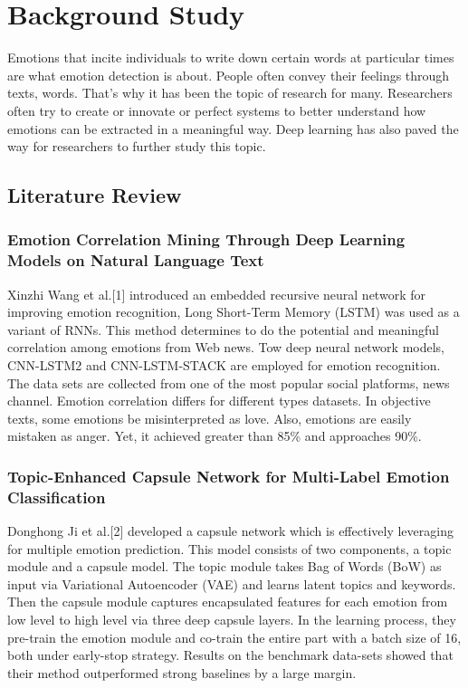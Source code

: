 \chapter{Background Study} \label{ch:literature_review}


Emotions that incite individuals to write down certain words at particular times are what emotion detection is about. People often convey their feelings through texts, words. That's why it has been the topic of research for many. Researchers often try to create or innovate or perfect systems to better understand how emotions can be extracted in a meaningful way. Deep learning has also paved the way for researchers to further study this topic.
\section{Literature Review}

\subsection{Emotion Correlation Mining Through Deep Learning Models on Natural Language Text}
Xinzhi Wang et al.[1] introduced an embedded recursive neural network for improving emotion recognition, Long Short-Term Memory (LSTM) was used as a variant of RNNs. This method determines to do the potential and meaningful correlation among emotions from Web news. Tow deep neural network models, CNN-LSTM2 and CNN-LSTM-STACK are employed for emotion recognition. The data sets are collected from one of the most popular social platforms, news channel. Emotion correlation differs for different types datasets. In objective texts, some emotions be misinterpreted as love. Also, emotions are easily mistaken as anger. Yet, it achieved greater than 85\% and approaches 90\%.


\subsection{Topic-Enhanced Capsule Network for Multi-Label Emotion Classification}
Donghong Ji et al.[2] developed a capsule network which is effectively leveraging for multiple emotion prediction. This model consists of two components, a topic module and a capsule model. The topic module takes Bag of Words (BoW) as input via Variational Autoencoder (VAE) and learns latent topics and keywords. Then the capsule module captures encapsulated features for each emotion from low level to high level via three deep capsule layers. In the learning process, they pre-train the emotion module and co-train the entire part with a batch size of 16, both under early-stop strategy. Results on the benchmark data-sets showed that their method outperformed strong baselines by a large margin.



